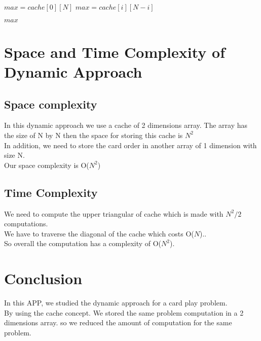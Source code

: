 \documentclass{article}
\begin{document}
\begin{algorithm}[H]
\begin{algorithmic}
\caption{}
\State $max = cache[0][N]$
		\State $max = cache[i][N-i]$	
	\EndIf
\EndFor

\Return $max$
\EndProcedure
\end{algorithmic}
\end{algorithm}


\section{Space and Time Complexity of Dynamic Approach}
\subsection{Space complexity}
In this dynamic approach we use a cache of 2 dimensions array. The array has the size of N by N then the space for storing this cache is $N^{2}$
\\[0.3cm]
In addition, we need to store the card order in another array of 1 dimension with size N.
\\[0.3cm]
Our space complexity is O($N^{2 }$)

\subsection{Time Complexity}

We need to compute the upper triangular of cache which is made with $N^{2}/2$ computations.
\\[0.3cm]
We have to traverse the diagonal of the cache which costs O($N$)..
\\[0.3cm]
So overall the computation has a complexity of O($N^{2}$).


\section{Conclusion}
In this APP, we studied the dynamic approach for a card play problem.
\\[0.5cm]
By using the cache concept. We stored the same problem computation in a 2 dimensions array. so we reduced the amount of computation for the same problem.
\end{document}

